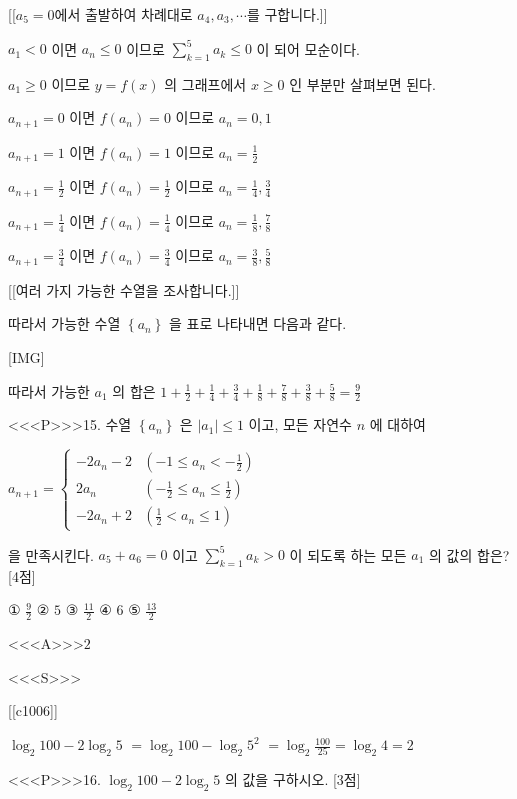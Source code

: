 \documentclass{oblivoir}
\begin{document}
[[$a_{5}=0$에서 출발하여 차례대로 $a_{4},a_{3},\cdots$를 구합니다.]]

$a_{1}<0$ 이면 $a_{n} \leq 0$ 이므로 $\sum_{k=1}^{5} a_{k} \leq 0$ 이 되어 모순이다.

$a_{1} \geq 0$ 이므로 $y=f(x)$ 의 그래프에서 $x \geq 0$ 인 부분만 살펴보면 된다.

$a_{n+1}=0$ 이면 $f\left(a_{n}\right)=0$ 이므로 $a_{n}=0,1$

$a_{n+1}=1$ 이면 $f\left(a_{n}\right)=1$ 이므로 $a_{n}=\frac{1}{2}$

$a_{n+1}=\frac{1}{2}$ 이면 $f\left(a_{n}\right)=\frac{1}{2}$ 이므로 $a_{n}=\frac{1}{4}, \frac{3}{4}$

$a_{n+1}=\frac{1}{4}$ 이면 $f\left(a_{n}\right)=\frac{1}{4} $ 이므로 $a_{n}=\frac{1}{8}, \frac{7}{8}$

$a_{n+1}=\frac{3}{4}$ 이면 $f\left(a_{n}\right)=\frac{3}{4} $ 이므로 $a_{n}=\frac{3}{8}, \frac{5}{8}$

[[여러 가지 가능한 수열을 조사합니다.]]

따라서 가능한 수열 $\left\{a_{n}\right\}$ 을 표로 나타내면 다음과 같다.

[IMG]

따라서 가능한 $a_{1}$ 의 합은 $1+\frac{1}{2}+\frac{1}{4}+\frac{3}{4}+\frac{1}{8}+\frac{7}{8}+\frac{3}{8}+\frac{5}{8}=\frac{9}{2}$


<<<P>>>15. 수열 $\left\{a_{n}\right\}$ 은 $\left|a_{1}\right| \leq 1$ 이고, 모든 자연수 $n$ 에 대하여

$a_{n+1}=\left\{\begin{array}{cl}
-2 a_{n}-2 & \left(-1 \leq a_{n}<-\frac{1}{2}\right)\\
2 a_{n} & \left(-\frac{1}{2} \leq a_{n} \leq \frac{1}{2}\right)\\
-2 a_{n}+2 & \left(\frac{1}{2}<a_{n} \leq 1\right)
\end{array}\right.$

을 만족시킨다. $a_{5}+a_{6}=0$ 이고 $\sum_{k=1}^{5} a_{k}>0$ 이 되도록 하는 모든 $a_{1}$ 의 값의 합은? [4점]

① $\frac{9}{2}$
② $5$
③ $\frac{11}{2}$
④ $6$
⑤ $\frac{13}{2}$

<<<A>>>$2$

<<<S>>>

[[c1006]]

$ \log _{2} 100-2 \log _{2} 5$ $=\log _{2} 100-\log _{2} 5^{2}$
$=\log _{2} \frac{100}{25}=\log _{2} 4=2 $


<<<P>>>16. $\log _{2} 100-2 \log _{2} 5$ 의 값을 구하시오. [3점]
\end{document}
